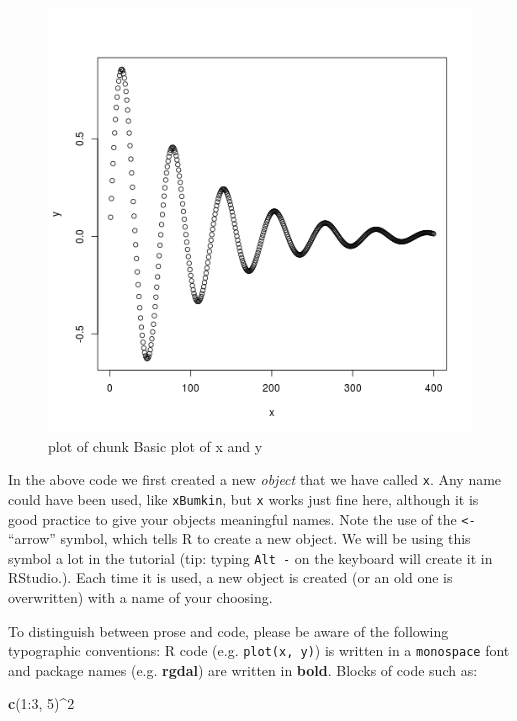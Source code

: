\documentclass[]{article}
\newenvironment{Shaded}{}{}
\newcommand{\KeywordTok}[1]{\textcolor[rgb]{0.00,0.44,0.13}{\textbf{{#1}}}}
\newcommand{\DecValTok}[1]{\textcolor[rgb]{0.25,0.63,0.44}{{#1}}}
\newcommand{\NormalTok}[1]{{#1}}
\begin{document}
\begin{figure}[htbp]
\centering
\includegraphics{figure/Basic_plot_of_x_and_y.png}
\caption{plot of chunk Basic plot of x and y}
\end{figure}

In the above code we first created a new \emph{object} that we have
called \texttt{x}. Any name could have been used, like \texttt{xBumkin},
but \texttt{x} works just fine here, although it is good practice to
give your objects meaningful names. Note the use of the
\texttt{\textless{}-} ``arrow'' symbol, which tells R to create a new
object. We will be using this symbol a lot in the tutorial (tip: typing
\texttt{Alt -} on the keyboard will create it in RStudio.). Each time it
is used, a new object is created (or an old one is overwritten) with a
name of your choosing.

To distinguish between prose and code, please be aware of the following
typographic conventions: R code (e.g. \texttt{plot(x, y)}) is written in
a \texttt{monospace} font and package names (e.g. \textbf{rgdal}) are
written in \textbf{bold}. Blocks of code such as:

\begin{Shaded}
\begin{Highlighting}[]
\KeywordTok{c}\NormalTok{(}\DecValTok{1}\NormalTok{:}\DecValTok{3}\NormalTok{, }\DecValTok{5}\NormalTok{)^}\DecValTok{2}
\end{Highlighting}
\end{Shaded}
\end{document}
